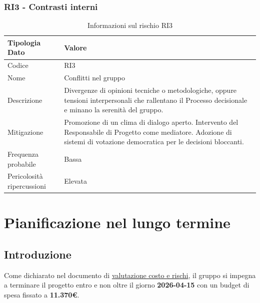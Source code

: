 \documentclass[a4paper,12pt]{article}
\begin{document}
\subsubsection{RI3 - Contrasti interni}
\begin{table}[H]
    \centering
    \renewcommand{\arraystretch}{1.4}
    \begin{tabularx}{\textwidth}{|L|Z|}
        \hline
        \textbf{Tipologia Dato} & \textbf{Valore} \\
        \hline
        Codice & RI3 \\
        \hline
        Nome & Conflitti nel gruppo \\
        \hline
        Descrizione & Divergenze di opinioni tecniche o metodologiche, oppure tensioni interpersonali che rallentano il Processo decisionale e minano la serenità del gruppo. \\
        \hline
        Mitigazione & Promozione di un clima di dialogo aperto. Intervento del Responsabile di Progetto come mediatore. Adozione di sistemi di votazione democratica per le decisioni bloccanti. \\
        \hline
        Frequenza probabile & Bassa \\
        \hline
        Pericolosità ripercussioni & Elevata \\
        \hline
    \end{tabularx}
    \caption{Informazioni sul rischio RI3}
    \label{tab:RI3}
\end{table}

\section{Pianificazione nel lungo termine}\label{sec:pianificazione_lungo_termine}

\subsection{Introduzione}
Come dichiarato nel documento di \href{https://swe-bitbybit.github.io/SWE-docs/docs/candidatura/valutazione_costi_rischi/valutazione_costi_rischi.pdf}{valutazione costo e rischi}, il gruppo si impegna a terminare il progetto entro e non oltre il giorno \textbf{2026-04-15} con un budget di spesa fissato a \textbf{11.370\euro}.
\end{document}
